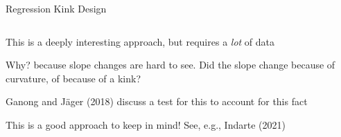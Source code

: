 \documentclass[notes,11pt, aspectratio=169]{beamer}
\newenvironment{wideitemize}{\itemize\addtolength{\itemsep}{10pt}}{\enditemize}
\begin{document}
\begin{frame}{Regression Kink Design}
    \begin{columns}[onlytextwidth, T] %
      \begin{column}{.6\textwidth}
        \begin{wideitemize}
        \item This is a deeply interesting approach, but requires a \emph{lot} of data
        \item Why? because slope changes are hard to see. Did the
          slope change because of curvature, of because of a kink?
        \item Ganong and J\"ager (2018) discuss a test for this to
          account for this fact
        \item This is a good approach to keep in mind! See, e.g.,
          Indarte (2021)
        \end{wideitemize}
      \end{column}%
      \hfill%
      \begin{column}{.4\textwidth}
      \end{column}%
    \end{columns}  
\end{frame}
\end{document}
